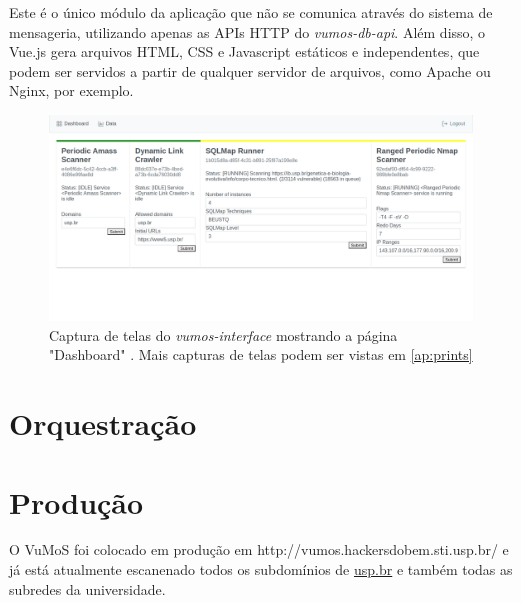     Este é o único módulo da aplicação que não se comunica através do sistema de mensageria, utilizando apenas as APIs HTTP do \textit{vumos-db-api}. Além disso, o Vue.js gera arquivos HTML, CSS e Javascript estáticos e independentes, que podem ser servidos a partir de qualquer servidor de arquivos, como Apache ou Nginx, por exemplo. 
    
    \begin{figure}[H]
        \includegraphics[scale=0.32]{figuras/vumos-interface-modules.png}
        \caption{Captura de telas do \textit{vumos-interface} mostrando a página "Dashboard" \label{fig:vumos-interface-modules}. Mais capturas de telas podem ser vistas em \ref{ap:prints}}
    \end{figure}
    
    
    

\section{Orquestração}
    

\section{Produção}
    O VuMoS foi colocado em produção em http://vumos.hackersdobem.sti.usp.br/ e já está atualmente escanenado todos os subdomínios de \url{usp.br} e também todas as subredes da universidade. 

